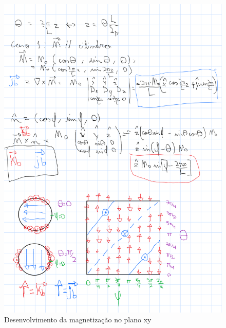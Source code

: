 \documentclass[a4paper, 12pt, twocolumn]{article}
\begin{document}
\begin{figure}
    \caption{Desenvolvimento da magnetização no plano xy}
    \label{fig:m1}
    \centering
    \includegraphics[width=1\textwidth]{m1.png}
\end{figure}
\end{document}
